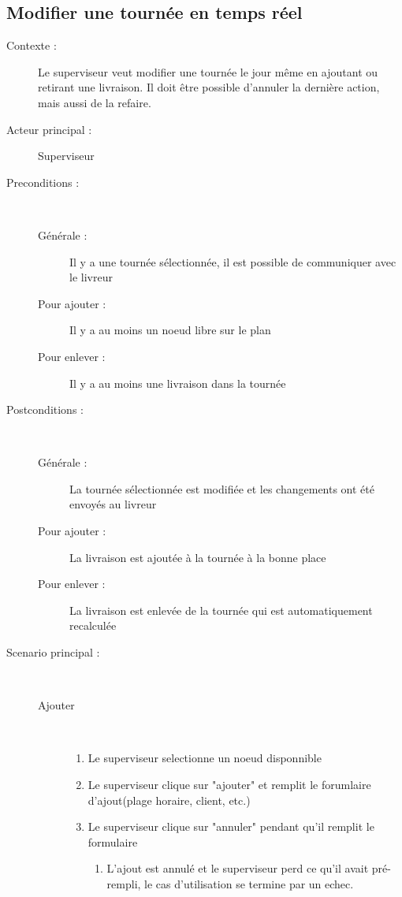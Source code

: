 \subsection{Modifier une tourn\'ee en temps r\'eel}
\begin{description}
    \item[Contexte :] Le superviseur veut modifier une tourn\'ee le jour m\^eme en ajoutant ou retirant une livraison. Il doit \^etre possible d'annuler la derni\`ere action, mais aussi de la refaire.
    \item[Acteur principal :] Superviseur
    \item[Preconditions :] ~
    \begin{description}
        \item[G\'en\'erale :] Il y a une tourn\'ee s\'electionn\'ee, il est possible de communiquer avec le livreur
        \item[Pour ajouter :] Il y a au moins un noeud libre sur le plan
        \item[Pour enlever :] Il y a au moins une livraison dans la tourn\'ee
    \end{description}
    \item[Postconditions :] ~
    \begin{description}
        \item[G\'en\'erale :] La tourn\'ee s\'electionn\'ee est modifi\'ee et les changements ont \'et\'e envoy\'es au livreur
        \item[Pour ajouter :] La livraison est ajout\'ee \`a la tourn\'ee \`a la bonne place
        \item[Pour enlever :] La livraison est enlev\'ee de la tourn\'ee qui est automatiquement recalcul\'ee
    \end{description}
    \item[Scenario principal :] ~
    \begin{description}
        \item[Ajouter] ~
        \begin{enumerate}
            \item Le superviseur selectionne un noeud disponnible
            \item Le superviseur clique sur "ajouter" et remplit le forumlaire d'ajout(plage horaire, client, etc.)
            \item Le superviseur clique sur "annuler" pendant qu'il remplit le formulaire
            \begin{enumerate}
                \item L'ajout est annul\'e et le superviseur perd ce qu'il avait pr\'e-rempli, le cas d'utilisation se termine par un echec.

\end{enumerate}
\end{enumerate}
\end{description}
\end{description}

